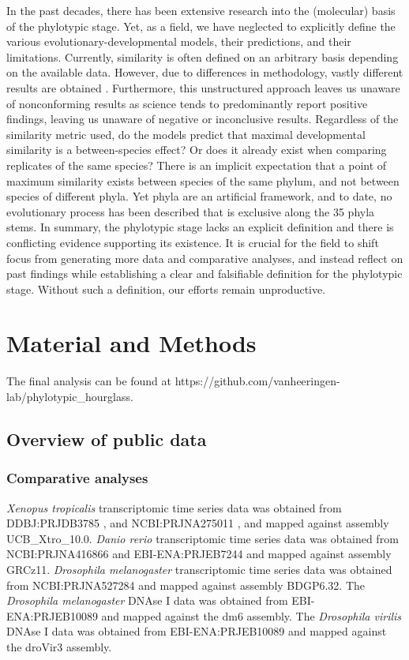 In the past decades, there has been extensive research into the (molecular) basis of the phylotypic stage. Yet, as a field, we have neglected to explicitly define the various evolutionary-developmental models, their predictions, and their limitations. Currently, similarity is often defined on an arbitrary basis depending on the available data. However,  due to differences in methodology, vastly different results are obtained  \cite{Piasecka2013,Dunn2018,Chan2021}. Furthermore, this unstructured approach leaves us unaware of nonconforming results as science tends to predominantly report positive findings, leaving us unaware of negative or inconclusive results. Regardless of the similarity metric used, do the models predict that maximal developmental similarity is a between-species effect? Or does it already exist when comparing replicates of the same species? There is an implicit expectation that a point of maximum similarity exists between species of the same phylum, and not between species of different phyla. Yet phyla are an artificial framework, and to date, no evolutionary process has been described that is exclusive along the 35 phyla stems\cite{hejnol2016}. In summary, the phylotypic stage lacks an explicit definition and there is conflicting evidence supporting its existence. It is crucial for the field to shift focus from generating more data and comparative analyses, and instead reflect on past findings while establishing a clear and falsifiable definition for the phylotypic stage. Without such a definition, our efforts remain unproductive.

\section{Material and Methods}

The final analysis can be found at https://github.com/vanheeringen-lab/phylotypic\_hourglass.

\subsection{Overview of public data}

\subsubsection{Comparative analyses}

\textit{Xenopus tropicalis} transcriptomic time series data was obtained from DDBJ:PRJDB3785 \cite{Hu2017}, and NCBI:PRJNA275011 \cite{Owens2016}, and mapped against assembly UCB\_Xtro\_10.0. \textit{Danio rerio} transcriptomic time series data was obtained from NCBI:PRJNA416866 \cite{marletaz2018} and EBI-ENA:PRJEB7244 \cite{White2017} and mapped against assembly GRCz11. \textit{Drosophila melanogaster} transcriptomic time series data was obtained from NCBI:PRJNA527284 \cite{Liu2021} and mapped against assembly BDGP6.32. The \textit{Drosophila melanogaster} DNAse I data was obtained from EBI-ENA:PRJEB10089 \cite{Liu2020} and mapped against the dm6 assembly. The \textit{Drosophila virilis} DNAse I data was obtained from EBI-ENA:PRJEB10089 \cite{Liu2020} and mapped against the droVir3 assembly.

